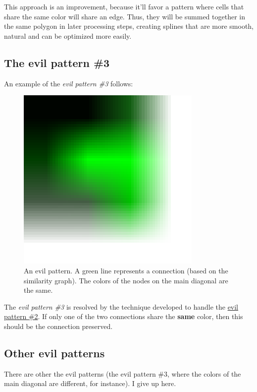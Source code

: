 This approach is an improvement, because it'll favor a pattern where cells that
share the same color will share an edge. Thus, they will be summed together in
the same polygon in later processing steps, creating splines that are more
smooth, natural and can be optimized more easily.

\subsection{The evil pattern \#3}

An example of the \emph{evil pattern \#3} follows:

\begin{figure}[H]
  \centering
  \includegraphics[width=0.8\textwidth]{assets/evil_pattern3.pdf}
  \caption{An evil pattern. A green line represents a connection (based on the
    similarity graph). The colors of the nodes on the main diagonal are the
    same.}
\end{figure}

The \emph{evil pattern \#3} is resolved by the technique developed to handle the
\hyperref[evil_pattern2]{evil pattern \#2}. If only one of the two connections
share the \textbf{same} color, then this should be the connection preserved.

\subsection{Other evil patterns}

There are other the evil patterns (the evil pattern \#3, where the colors of the
main diagonal are different, for instance). I give up here.

